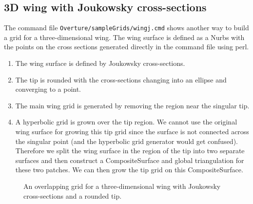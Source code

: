 \documentclass[xcolor=rgb,svgnames,dvipsnames]{article}
\newcommand{\figures}{../fig}
\begin{document}
\subsection{3D wing with Joukowsky cross-sections}\label{sec:JoukowskyWing3d}

The command file {\tt Overture/sampleGrids/wingj.cmd} shows another way to build a grid 
for a three-dimensional wing. The wing surface is defined as a Nurbs with the points
on the cross sections generated directly in the command file using perl. 

\begin{enumerate}
  \item The wing surface is defined by Joukowsky cross-sections.
  \item The tip is rounded with the cross-sections changing into an ellipse and converging to a point. 
  \item The main wing grid is generated by removing the region near the singular tip.
  \item A hyperbolic grid is grown over the tip region. We cannot use the original wing surface for growing
        this tip grid
        since the surface is not connected across the singular point (and the hyperbolic grid generator
        would get confused). Therefore we split the wing surface in the region of the tip into two
        separate surfaces and then construct a CompositeSurface and global triangulation for these
        two patches. We can then grow the tip grid on this CompositeSurface. 
\end{enumerate}

{
\newcommand{\figWidthd}{8cm}
\newcommand{\trimfig}[2]{\trimPlot{#1}{#2}{.0}{.0}{.25}{.23}}
\begin{figure}[hbt]
\begin{center}
\end{center}
  \caption{An overlapping grid for a three-dimensional wing with Joukowsky cross-sections and
       a rounded tip. } \label{fig:JoukowskyWing3d}
\end{figure}
}
\end{document}
